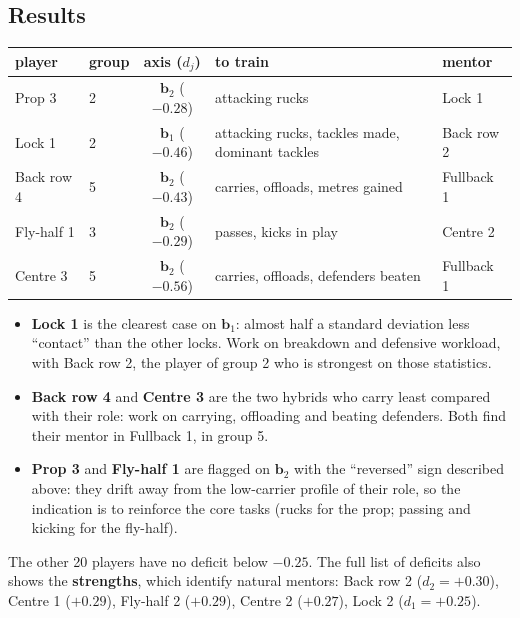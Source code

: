 \documentclass[11pt,a4paper]{article}
\theoremstyle{remark}
\newcommand{\bb}{\mathbf{b}}
\begin{document}
\subsection{Results}
\begin{center}
\begin{tabular}{llcll}
\toprule
player & group & axis ($d_j$) & to train & mentor\\
\midrule
Prop 3 & 2 & $\bb_2$ ($-0.28$) & attacking rucks & Lock 1\\
Lock 1 & 2 & $\bb_1$ ($-0.46$) & attacking rucks, tackles made, dominant tackles & Back row 2\\
Back row 4 & 5 & $\bb_2$ ($-0.43$) & carries, offloads, metres gained & Fullback 1\\
Fly-half 1 & 3 & $\bb_2$ ($-0.29$) & passes, kicks in play & Centre 2\\
Centre 3 & 5 & $\bb_2$ ($-0.56$) & carries, offloads, defenders beaten & Fullback 1\\
\bottomrule
\end{tabular}
\end{center}
\begin{itemize}
\item \textbf{Lock 1} is the clearest case on $\bb_1$: almost half a standard deviation less ``contact'' than the
other locks. Work on breakdown and defensive workload, with Back row 2, the player of group 2 who is strongest on those statistics.
\item \textbf{Back row 4} and \textbf{Centre 3} are the two hybrids who carry least compared with their role:
work on carrying, offloading and beating defenders. Both find their mentor in Fullback 1, in group 5.
\item \textbf{Prop 3} and \textbf{Fly-half 1} are flagged on $\bb_2$ with the ``reversed'' sign described above:
they drift away from the low-carrier profile of their role, so the indication is to reinforce the core
tasks (rucks for the prop; passing and kicking for the fly-half).
\end{itemize}
The other 20 players have no deficit below $-0.25$. The full list of deficits also shows the
\textbf{strengths}, which identify natural mentors: Back row 2 ($d_2=+0.30$), Centre 1 ($+0.29$),
Fly-half 2 ($+0.29$), Centre 2 ($+0.27$), Lock 2 ($d_1=+0.25$).
\end{document}
